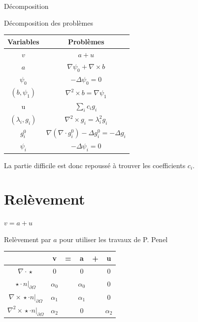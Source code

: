 \documentclass{beamer}
\newcommand{\grad}{{\nabla}}
\newcommand{\laplace}{{\Delta}}
\newcommand{\rot}{{\nabla\times}}
\newcommand{\rott}{{\nabla^2\times}}
\newcommand{\diverg}{{\nabla\cdot}}
\newcommand{\restr}{{\big\rvert_{\partial\Omega}}}
\begin{document}
\begin{frame}{Décomposition}
\begin{block}{Décomposition des problèmes}
\begin{center}
\begin{tabular}{|c|c|}
\hline
Variables & Problèmes\\ \hline
$v$ & $a + u$ \\ \hline
$a$ & $\grad\psi_0 + \rot b$\\ \hline
$\psi_0$ & $-\laplace\psi_0 = 0$\\ \hline
$(b,\psi_1)$ & $\rott b= \grad\psi_1$ \\ \hline
u & $\sum_i c_ig_i$ \\ \hline
$(\lambda_i,g_i)$ & $\rott  g_i = \lambda_i^2 g_i$ \\ \hline
$g_i^0$ & $\grad(\diverg g_i^0) - \laplace g_i^0 = - \laplace g_i$\\ \hline
$\psi_i$ & $-\laplace \psi_i = 0$\\ \hline
\end{tabular}
\end{center}
La partie difficile est donc repoussé à trouver les coefficients $c_i$. 
\end{block}
\end{frame}

\section{Relèvement}
\begin{frame}{$v=a+u$}
\begin{block}{Relèvement par $a$ pour utiliser les travaux de P. Penel}
\begin{center}
\begin{tabular}{c|ccccc}
& v & = & a & + & u \\ \hline
$\diverg\star$ & 0 & & 0 & & 0\\ \hline
$\star\cdot n\restr$ & $\alpha_0$ & & $\alpha_0$ & & 0\\ \hline
$\rot\star\cdot n\restr$ & $\alpha_1$ & & $\alpha_1$ & & 0\\\hline
$\rott\star\cdot n\restr$ & $\alpha_2$ & & 0 & & $\alpha_2$ 
\end{tabular}
\end{center}
\end{block}
\end{frame}
\end{document}
